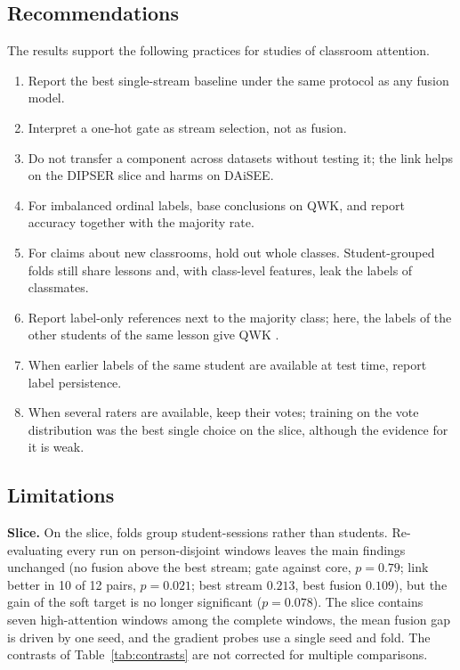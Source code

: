 \subsection{Recommendations}
The results support the following practices for studies of classroom attention.
\begin{enumerate}
\item Report the best single-stream baseline under the same protocol as any fusion model.
\item Interpret a one-hot gate as stream selection, not as fusion.
\item Do not transfer a component across datasets without testing it; the link helps on the DIPSER slice and harms on DAiSEE.
\item For imbalanced ordinal labels, base conclusions on QWK, and report accuracy together with the majority rate.
\item For claims about new classrooms, hold out whole classes. Student-grouped folds still share lessons and, with class-level features, leak the labels of classmates.
\item Report label-only references next to the majority class; here, the labels of the other students of the same lesson give QWK \fcExpPrior.
\item When earlier labels of the same student are available at test time, report label persistence.
\item When several raters are available, keep their votes; training on the vote distribution was the best single choice on the slice, although the evidence for it is weak.
\end{enumerate}

\subsection{Limitations}
\label{sec:threats}
\textbf{Slice.} On the slice, folds group student-sessions rather than students. Re-evaluating every run on person-disjoint windows leaves the main findings unchanged (no fusion above the best stream; gate against core, $p=0.79$; link better in 10 of 12 pairs, $p=0.021$; best stream $0.213$, best fusion $0.109$), but the gain of the soft target is no longer significant ($p=0.078$). The slice contains seven high-attention windows among the complete windows, the mean fusion gap is driven by one seed, and the gradient probes use a single seed and fold. The contrasts of Table~\ref{tab:contrasts} are not corrected for multiple comparisons.

